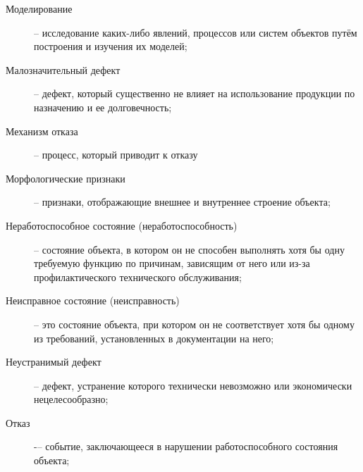 \begin{description}
\item
[Моделирование]-- исследование каких-либо явлений, процессов или систем объектов путём построения и изучения их моделей;
\item
[Малозначительный дефект] -- дефект, который существенно не влияет на использование продукции по назначению и ее долговечность;
\item
[Механизм отказа] -- процесс, который приводит к отказу
\item
[Морфологические признаки]-- признаки, отображающие внешнее и внутреннее строение объекта;
\item
[Неработоспособное состояние (неработоспособность)] -- состояние объекта, в котором он не способен выполнять хотя бы одну требуемую функцию по причинам, зависящим от него или из-за профилактического технического обслуживания;
\item
[Неисправное состояние (неисправность) ] -- это состояние объекта, при котором он не соответствует хотя бы одному из требований, установленных в документации на него;
\item
[Неустранимый дефект] -- дефект, устранение которого технически невозможно или экономически нецелесообразно;
\item
[Отказ]  -–  событие, заключающееся в нарушении работоспособного состояния объекта;


\end{description}
